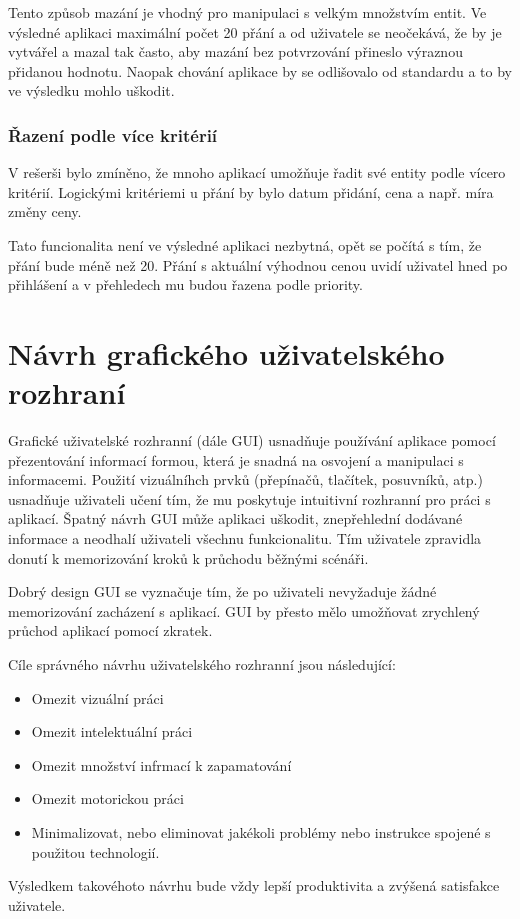 Tento způsob mazání je vhodný pro manipulaci s velkým množstvím entit. Ve výsledné aplikaci maximální počet 20 přání a od uživatele se neočekává, že by je vytvářel a mazal tak často, aby mazání bez potvrzování přineslo výraznou přidanou hodnotu. Naopak chování aplikace by se odlišovalo od standardu a to by ve výsledku mohlo uškodit.

\subsubsection{Řazení podle více kritérií}
V rešerši bylo zmíněno, že mnoho aplikací umožňuje řadit své entity podle vícero kritérií. Logickými kritériemi u přání by bylo datum přidání, cena a např. míra změny ceny.

Tato funcionalita není ve výsledné aplikaci nezbytná, opět se počítá s tím, že přání bude méně než 20. Přání s aktuální výhodnou cenou uvidí uživatel hned po přihlášení a v přehledech mu budou řazena podle priority.

\section{Návrh grafického uživatelského rozhraní}
Grafické uživatelské rozhranní (dále GUI) usnadňuje používání aplikace pomocí přezentování informací formou, která je snadná na osvojení a manipulaci s informacemi. Použití vizuálníhch prvků (přepínačů, tlačítek, posuvníků, atp.) usnadňuje uživateli učení tím, že mu poskytuje intuitivní rozhranní pro práci s aplikací. Špatný návrh GUI může aplikaci uškodit, znepřehlední dodávané informace a neodhalí uživateli všechnu funkcionalitu. Tím uživatele zpravidla donutí k memorizování kroků k průchodu běžnými scénáři\cite{toby2001expgui}.

Dobrý design GUI se vyznačuje tím, že po uživateli nevyžaduje žádné memorizování zacházení s aplikací. GUI by přesto mělo umožňovat zrychlený průchod aplikací pomocí zkratek\cite{toby2001expgui}.

Cíle správného návrhu uživatelského rozhranní jsou následující\cite{galitz2007essential}:
\begin{itemize}
\item Omezit vizuální práci
\item Omezit intelektuální práci
\item Omezit množství infrmací k zapamatování
\item Omezit motorickou práci
\item Minimalizovat, nebo eliminovat jakékoli problémy nebo instrukce spojené s použitou technologií.
\end{itemize}
Výsledkem takovéhoto návrhu bude vždy lepší produktivita a zvýšená satisfakce uživatele\cite{galitz2007essential}.

